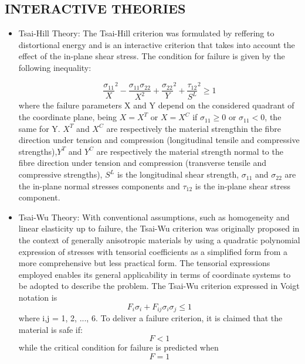 \documentclass[letterpaper]{article}
\begin{document}
\begin{multicols}{2}
	\subsection*{INTERACTIVE THEORIES}
	\begin{itemize}
		\item Tsai-Hill Theory: The Tsai-Hill criterion was formulated by reffering to distortional energy and is an interactive criterion that takes into account the effect of the in-plane shear stress. The condition for failure is given by the following inequality:

			\begin{equation}
				\frac{\sigma_{11}}{X}^2 - \frac{\sigma_{11}\sigma_{22}}{X^2} + \frac{\sigma_{22}}{Y}^2 + \frac{\tau_{12}}{S^L}^2 \geq 1
			\end{equation}
			where the failure parameters X and Y depend on the considered quadrant of the coordinate plane, being $X = X^T$ or $X = X^C$ if $\sigma_{11} \geq 0$ or $\sigma_{11} < 0$, the same for Y.
			$X^T$ and $X^C$ are respectively the material strengthin the fibre direction under tension and compression (longitudinal tensile and compressive strengths),$Y^T$ and $Y^C$ are respectively the material strength normal to the fibre direction under tension and compression (transverse tensile and compressive strengths), $S^L$ is the longitudinal shear strength, $\sigma_{11}$ and $\sigma_{22}$ are the in-plane normal stresses components and $\tau_{12}$ is the in-plane shear stress component.\supercite{grasso18}

		\item Tsai-Wu Theory: With conventional assumptions, such as homogeneity and linear elasticity up to failure, the Tsai-Wu criterion was originally proposed in the context of generally anisotropic materials by using a quadratic polynomial expression of stresses with tensorial coefficients as a simplified form from a more comprehensive but less practical form. The tensorial expressions employed enables its general applicability in terms of coordinate systems to be adopted to describe the problem\supercite{li17}. The Tsai-Wu criterion expressed in Voigt notation is
			\begin{equation}
				F_i \sigma_i + F_{ij} \sigma_i \sigma_j \leq 1
			\end{equation}
			where i,j = 1, 2, ..., 6. To deliver a failure criterion, it is claimed that the material is safe if: 
			\begin{equation}
				F < 1 
			\end{equation}
			while the critical condition for failure is predicted when
			\begin{equation}
				F = 1
			\end{equation}
	\end{itemize}


\end{multicols}
\end{document}
